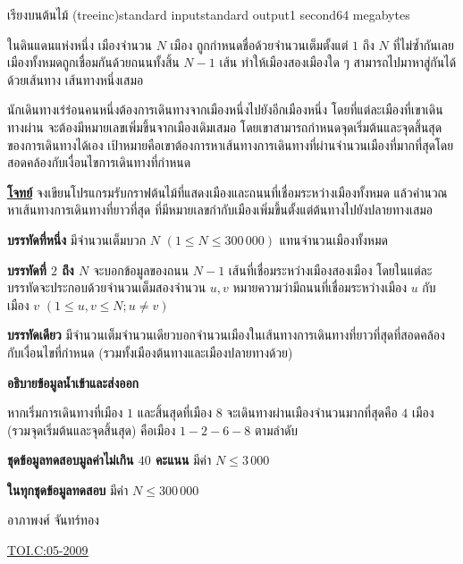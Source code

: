 \documentclass[11pt,a4paper]{article}
\begin{document}
\begin{problem}{เรียงบนต้นไม้ (treeinc)}{standard input}{standard output}{1 second}{64 megabytes}

    ในดินแดนแห่งหนึ่ง เมืองจำนวน $N$ เมือง ถูกกำหนดชื่อด้วยจำนวนเต็มตั้งแต่ $1$ ถึง $N$ ที่ไม่ซ้ำกันเลย  เมืองทั้งหมดถูกเชื่อมกันด้วยถนนทั้งสิ้น $N-1$ เส้น ทำให้เมืองสองเมืองใด ๆ สามารถไปมาหาสู่กันได้ด้วยเส้นทาง เส้นทางหนึ่งเสมอ
    
    นักเดินทางเร่ร่อนคนหนึ่งต้องการเดินทางจากเมืองหนึ่งไปยังอีกเมืองหนึ่ง โดยที่แต่ละเมืองที่เขาเดินทางผ่าน จะต้องมีหมายเลขเพิ่มขึ้นจากเมืองเดิมเสมอ โดยเขาสามารถกำหนดจุดเริ่มต้นและจุดสิ้นสุดของการเดินทางได้เอง  เป้าหมายคือเขาต้องการหาเส้นทางการเดินทางที่ผ่านจำนวนเมืองที่มากที่สุดโดยสอดคล้องกับเงื่อนไขการเดินทางที่กำหนด

\bigskip
\underline{\textbf{โจทย์}}  จงเขียนโปรแกรมรับกราฟต้นไม้ที่แสดงเมืองและถนนที่เชื่อมระหว่างเมืองทั้งหมด แล้วคำนวณหาเส้นทางการเดินทางที่ยาวที่สุด ที่มีหมายเลขกำกับเมืองเพิ่มขึ้นตั้งแต่ต้นทางไปยังปลายทางเสมอ


\InputFile

\textbf{บรรทัดที่หนึ่ง} มีจำนวนเต็มบวก $N$ $(1 \leq N \leq 300\,000)$ แทนจำนวนเมืองทั้งหมด
 
 
\textbf{บรรทัดที่ $2$ ถึง $N$} จะบอกข้อมูลของถนน $N-1$ เส้นที่เชื่อมระหว่างเมืองสองเมือง โดยในแต่ละบรรทัดจะประกอบด้วยจำนวนเต็มสองจำนวน $u,v$ หมายความว่ามีถนนที่เชื่อมระหว่างเมือง $u$ กับเมือง $v$ $(1 \leq u,v \leq N ; u \neq v)$



\OutputFile

\textbf{บรรทัดเดียว} มีจำนวนเต็มจำนวนเดียวบอกจำนวนเมืองในเส้นทางการเดินทางที่ยาวที่สุดที่สอดคล้องกับเงื่อนไขที่กำหนด (รวมทั้งเมืองต้นทางและเมืองปลายทางด้วย)

\Examples

\begin{example}
%
\end{example}

\Note 

\textbf{อธิบายข้อมูลน้ำเข้าและส่งออก}

หากเริ่มการเดินทางที่เมือง $1$ และสิ้นสุดที่เมือง $8$ จะเดินทางผ่านเมืองจำนวนมากที่สุดคือ $4$ เมือง (รวมจุดเริ่มต้นและจุดสิ้นสุด) คือเมือง $1-2-6-8$ ตามลำดับ
          
          
\Scoring

  \textbf{ชุดข้อมูลทดสอบมูลค่าไม่เกิน $40$ คะแนน} มีค่า $N \leq 3\,000$ 
  
\textbf{ในทุกชุดข้อมูลทดสอบ} มีค่า $N \leq 300\,000$
  
\Source

อาภาพงศ์ จันทร์ทอง

\underline{\href{http://www.thailandoi.org/toi.c/05-2009}{TOI.C:05-2009}}


\end{problem}
\end{document}
